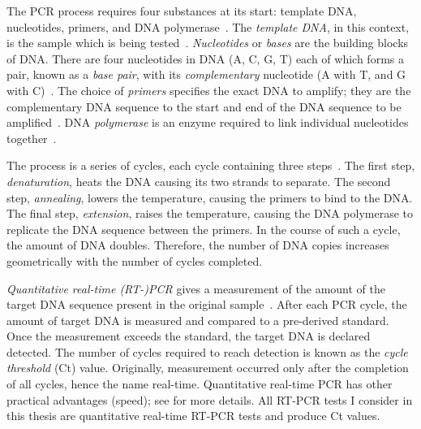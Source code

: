 \documentclass[thesis.tex]{subfiles}
\begin{document}

The PCR process requires four substances at its start: template DNA, nucleotides, primers, and DNA polymerase~\autocite{garibyanPCR}.
The \emph{template DNA}, in this context, is the sample which is being tested~\autocite{caseTemplate}.
\emph{Nucleotides} or \emph{bases} are the building blocks of DNA.
There are four nucleotides in DNA (A, C, G, T) each of which forms a pair, known as a \emph{base pair}, with its \emph{complementary} nucleotide (A with T, and G with C)~\autocite{batesBase}.
The choice of \emph{primers} specifies the exact DNA to amplify; they are the complementary DNA sequence to the start and end of the DNA sequence to be amplified~\autocite{garibyanPCR}.
DNA \emph{polymerase} is an enzyme required to link individual nucleotides together~\autocite{garibyanPCR}.

The process is a series of cycles, each cycle containing three steps~\autocite{powledgePCR,garibyanPCR}.
The first step, \emph{denaturation}, heats the DNA causing its two strands to separate.
The second step, \emph{annealing}, lowers the temperature, causing the primers to bind to the DNA.
The final step, \emph{extension}, raises the temperature, causing the DNA polymerase to replicate the DNA sequence between the primers. 
In the course of such a cycle, the amount of DNA doubles.
Therefore, the number of DNA copies increases geometrically with the number of cycles completed.

\emph{Quantitative real-time (RT-)PCR} gives a measurement of the amount of the target DNA sequence present in the original sample~\autocite{yangPCRdiagnostics}.
After each PCR cycle, the amount of target DNA is measured and compared to a pre-derived standard.
Once the measurement exceeds the standard, the target DNA is declared detected. 
The number of cycles required to reach detection is known as the \emph{cycle threshold} (Ct) value.
Originally, measurement occurred only after the completion of all cycles, hence the name real-time.
Quantitative real-time PCR has other practical advantages (\eg speed); see \textcite{yangPCRdiagnostics,valasekPower} for more details.
All RT-PCR tests I consider in this thesis are quantitative real-time RT-PCR tests and produce Ct values.
\end{document}

